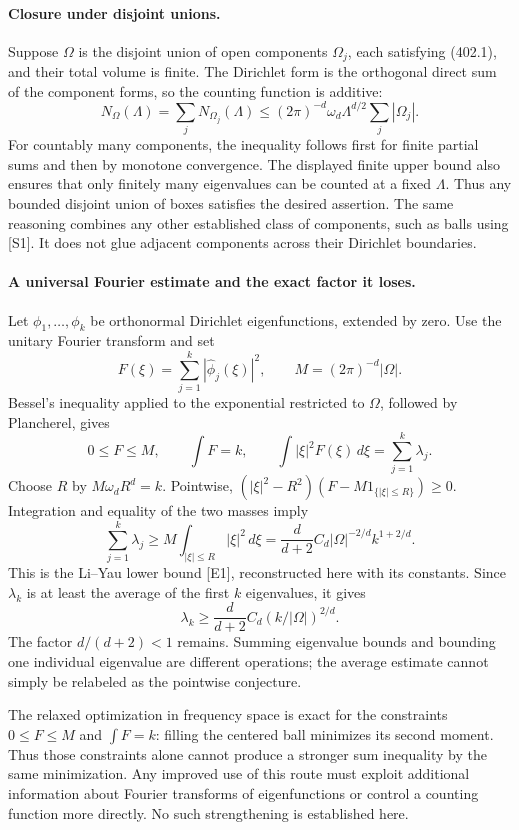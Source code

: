 \documentclass[11pt]{article}
\begin{document}
\paragraph{Closure under disjoint unions.}
Suppose $\Omega$ is the disjoint union of open components $\Omega_j$, each satisfying (402.1), and their total volume is finite. The Dirichlet form is the orthogonal direct sum of the component forms, so the counting function is additive:
\[
 N_\Omega(\Lambda)=\sum_jN_{\Omega_j}(\Lambda)
 \le(2\pi)^{-d}\omega_d\Lambda^{d/2}\sum_j|\Omega_j|.
 \tag{402.4}
\]
For countably many components, the inequality follows first for finite partial sums and then by monotone convergence. The displayed finite upper bound also ensures that only finitely many eigenvalues can be counted at a fixed $\Lambda$. Thus any bounded disjoint union of boxes satisfies the desired assertion. The same reasoning combines any other established class of components, such as balls using [S1]. It does not glue adjacent components across their Dirichlet boundaries.

\paragraph{A universal Fourier estimate and the exact factor it loses.}
Let $\phi_1,\ldots,\phi_k$ be orthonormal Dirichlet eigenfunctions, extended by zero. Use the unitary Fourier transform and set
\[
 F(\xi)=\sum_{j=1}^k|\widehat\phi_j(\xi)|^2,
 \qquad M=(2\pi)^{-d}|\Omega|.
\]
Bessel's inequality applied to the exponential restricted to $\Omega$, followed by Plancherel, gives
\[
 0\le F\le M,\qquad \int F=k,\qquad
 \int |\xi|^2F(\xi)\,d\xi=\sum_{j=1}^k\lambda_j.
\]
Choose $R$ by $M\omega_dR^d=k$. Pointwise,
$(|\xi|^2-R^2)(F-M1_{\{|\xi|\le R\}})\ge0$.
Integration and equality of the two masses imply
\[
 \sum_{j=1}^k\lambda_j
 \ge M\int_{|\xi|\le R}|\xi|^2\,d\xi
 =\frac d{d+2}C_d|\Omega|^{-2/d}k^{1+2/d}.
 \tag{402.5}
\]
This is the Li--Yau lower bound [E1], reconstructed here with its constants. Since $\lambda_k$ is at least the average of the first $k$ eigenvalues, it gives
\[
 \lambda_k\ge\frac d{d+2}C_d(k/|\Omega|)^{2/d}.
 \tag{402.6}
\]
The factor $d/(d+2)<1$ remains. Summing eigenvalue bounds and bounding one individual eigenvalue are different operations; the average estimate cannot simply be relabeled as the pointwise conjecture.

The relaxed optimization in frequency space is exact for the constraints $0\le F\le M$ and $\int F=k$: filling the centered ball minimizes its second moment. Thus those constraints alone cannot produce a stronger sum inequality by the same minimization. Any improved use of this route must exploit additional information about Fourier transforms of eigenfunctions or control a counting function more directly. No such strengthening is established here.
\end{document}
